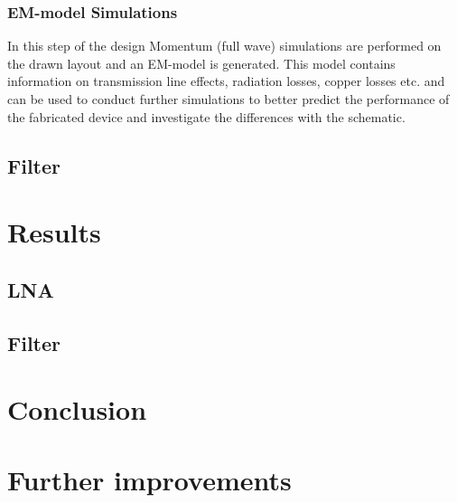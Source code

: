 \documentclass[a4paper]{article}        %
\begin{document}
		\subsubsection{EM-model Simulations}
			In this step of the design Momentum (full wave) simulations are performed on the drawn layout and an EM-model is generated. This model contains information on transmission line effects, radiation losses, copper losses etc. and can be used to conduct further simulations to better predict the performance of the fabricated device and investigate the differences with the schematic. 

	\subsection{Filter}
\section{Results}
	\subsection{LNA}

	\subsection{Filter}
\section{Conclusion}

\section{Further improvements}



\end{document}

